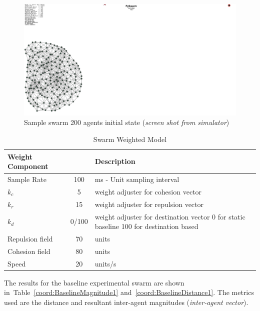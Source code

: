 \begin{figure}[H]
\begin{center}
\includegraphics[width=14cm]{CHAPTER-6/figures/SampleSwarm200-1}
\end{center}
\caption[Sample swarm 200 agents initial state]{Sample swarm 200 agents initial state (\textit{screen shot from simulator})\label{fig:SampleSwarm200-1}}
\end{figure}

\begin{table}[H]
\begin{center}
\begin{tabular}{| p{2.5cm} | c | p{7cm} |}
\hline
\bf Weight \bf Component & \bf \swarmA{} & \bf Description \\ \hline
Sample Rate & 100 & ms - Unit sampling interval\\  \hline
$k_c$ & 5 & weight adjuster for cohesion vector\\  \hline
$k_r$ & 15 & weight adjuster for repulsion  vector\\  \hline
$k_d$ & 0/100 & weight adjuster for destination vector 0 for static baseline 100 for destination based\\  \hline
Repulsion field & 70 & units\\  \hline
Cohesion field & 80 & units\\  \hline
Speed & 20 & units/s\\  \hline
\end{tabular}\caption{Swarm Weighted Model} \label{tab:DynamicPhysics1}
\end{center}
\end{table}

The results for the baseline experimental swarm are shown in~Table~\ref{coord:BaselineMagnitude1} and~\ref{coord:BaselineDistance1}. The metrics used are the distance \cite{NIM:09} and resultant inter-agent magnitudes (\textit{inter-agent vector}).

